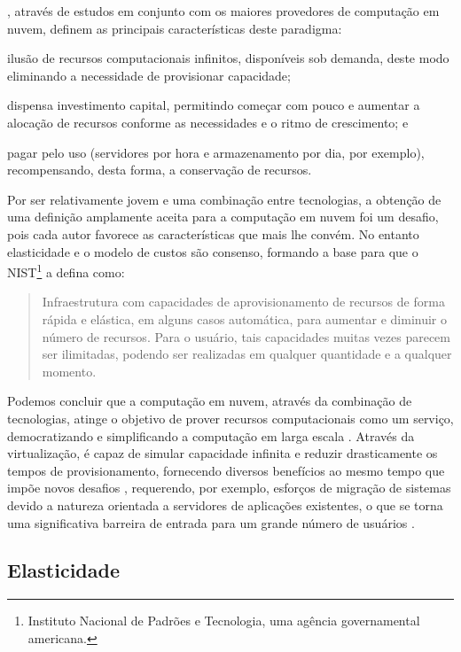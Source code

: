 \documentclass[english,brazilian]{UNISINOSmonografia} %
\begin{document}
, através de estudos em conjunto com os maiores provedores de computação em nuvem, definem as principais características deste paradigma:
\begin{inparaenum}
	\item ilusão de recursos computacionais infinitos, disponíveis sob demanda, deste modo eliminando a necessidade de provisionar capacidade;
	\item dispensa investimento capital, permitindo começar com pouco e aumentar a alocação de recursos conforme as necessidades e o ritmo de crescimento; e
	\item pagar pelo uso (servidores por hora e armazenamento por dia, por exemplo), recompensando, desta forma, a conservação de recursos.
\end{inparaenum}


Por ser relativamente jovem e uma combinação entre tecnologias, a obtenção de uma definição amplamente aceita para a computação em nuvem foi um desafio, pois cada autor favorece as características que mais lhe convém.
No entanto elasticidade e o modelo de custos são consenso, formando a base para que o NIST\footnote{
	Instituto Nacional de Padrões e Tecnologia, uma agência governamental americana.
} a defina como:

\begin{quote}
	Infraestrutura com capacidades de aprovisionamento de recursos de forma rápida e elástica, em alguns
	casos automática, para aumentar e diminuir o número de recursos. Para o usuário, tais capacidades muitas vezes
	parecem ser ilimitadas, podendo ser realizadas em qualquer quantidade e a qualquer momento.
\end{quote}

Podemos concluir que a computação em nuvem, através da combinação de tecnologias, atinge o objetivo de prover recursos computacionais como um serviço, democratizando e simplificando a computação em larga escala \cite{Awada2017}.
Através da virtualização, é capaz de simular capacidade infinita e reduzir drasticamente os tempos de provisionamento, fornecendo diversos benefícios ao mesmo tempo que impõe novos desafios \cite{Zhang2010}, requerendo, por exemplo, esforços de migração de sistemas devido a natureza orientada a servidores de aplicações existentes, o que se torna uma significativa barreira de entrada para um grande número de usuários \cite{Jonas2017}.

\subsection{Elasticidade}
\label{sec:elasticidade}
\end{document}
